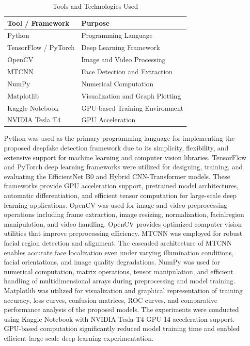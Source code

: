 \documentclass[conference]{IEEEtran}
\begin{document}
\begin{table}[htbp]
\caption{Tools and Technologies Used}
\begin{center}
\begin{tabular}{|l|l|}
\hline
\textbf{Tool / Framework} & \textbf{Purpose} \\
\hline
Python               & Programming Language \\
TensorFlow / PyTorch & Deep Learning Framework \\
OpenCV               & Image and Video Processing \\
MTCNN                & Face Detection and Extraction \\
NumPy                & Numerical Computation \\
Matplotlib           & Visualization and Graph Plotting \\
Kaggle Notebook      & GPU-based Training Environment \\
NVIDIA Tesla T4      & GPU Acceleration \\
\hline
\end{tabular}
\label{tab2}
\end{center}
\end{table}
Python was used as the primary programming language for implementing the proposed deepfake detection framework due to its simplicity, flexibility, and extensive support for machine learning and computer vision libraries. TensorFlow and PyTorch deep learning frameworks were utilized for designing, training, and evaluating the EfficientNet B0 and Hybrid CNN-Transformer models. These frameworks provide GPU acceleration support, pretrained model architectures, automatic differentiation, and efficient tensor computation for large-scale deep learning applications. OpenCV was used for image and video preprocessing operations including frame extraction, image resizing, normalization, facialregion manipulation, and video handling. OpenCV provides optimized computer vision
utilities that improve preprocessing efficiency. MTCNN was employed for robust facial region detection and alignment. The cascaded architecture of MTCNN enables accurate face localization even under varying illumination conditions, facial orientations, and
image quality degradations. NumPy was used for numerical computation, matrix operations, tensor manipulation, and efficient handling of multidimensional arrays during preprocessing and model training. Matplotlib was utilized for visualization and graphical
representation of training accuracy, loss curves, confusion matrices, ROC curves, and comparative performance analysis of the proposed models. The experiments were conducted using Kaggle Notebook with NVIDIA Tesla T4 GPU 14 acceleration support. GPU-based computation significantly reduced model training time and enabled efficient
large-scale deep learning experimentation.
\end{document}
